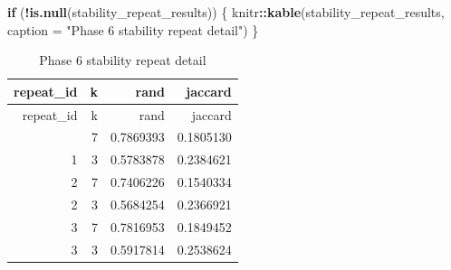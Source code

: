 \documentclass[
]{article}
\newenvironment{Shaded}{\begin{snugshade}}{\end{snugshade}}
\newcommand{\AttributeTok}[1]{\textcolor[rgb]{0.13,0.29,0.53}{#1}}
\newcommand{\ControlFlowTok}[1]{\textcolor[rgb]{0.13,0.29,0.53}{\textbf{#1}}}
\newcommand{\FunctionTok}[1]{\textcolor[rgb]{0.13,0.29,0.53}{\textbf{#1}}}
\newcommand{\NormalTok}[1]{#1}
\newcommand{\SpecialCharTok}[1]{\textcolor[rgb]{0.81,0.36,0.00}{\textbf{#1}}}
\newcommand{\StringTok}[1]{\textcolor[rgb]{0.31,0.60,0.02}{#1}}
\begin{document}
\begin{Shaded}
\begin{Highlighting}[]
\ControlFlowTok{if}\NormalTok{ (}\SpecialCharTok{!}\FunctionTok{is.null}\NormalTok{(stability\_repeat\_results)) \{}
\NormalTok{  knitr}\SpecialCharTok{::}\FunctionTok{kable}\NormalTok{(stability\_repeat\_results, }\AttributeTok{caption =} \StringTok{"Phase 6 stability repeat detail"}\NormalTok{)}
\NormalTok{\}}
\end{Highlighting}
\end{Shaded}

\begin{longtable}[]{@{}rrrr@{}}
\caption{Phase 6 stability repeat detail}\tabularnewline
\toprule\noalign{}
repeat\_id & k & rand & jaccard \\
\midrule\noalign{}
\endfirsthead
\toprule\noalign{}
repeat\_id & k & rand & jaccard \\
\midrule\noalign{}
\endhead
\bottomrule\noalign{}
\endlastfoot
1 & 7 & 0.7869393 & 0.1805130 \\
1 & 3 & 0.5783878 & 0.2384621 \\
2 & 7 & 0.7406226 & 0.1540334 \\
2 & 3 & 0.5684254 & 0.2366921 \\
3 & 7 & 0.7816953 & 0.1849452 \\
3 & 3 & 0.5917814 & 0.2538624 \\
\end{longtable}
\end{document}
